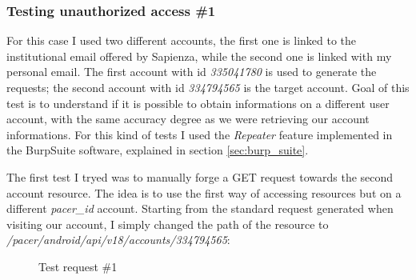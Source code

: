 		\subsubsection{Testing unauthorized access \#1}
			\par For this case I used two different accounts, the first one is linked to the institutional email offered by Sapienza, while the second one is linked with my personal email. The first account with id \textit{335041780} is used to generate the requests; the second account with id \textit{334794565} is the target account. Goal of this test is to understand if it is possible to obtain informations on a different user account, with the same accuracy degree as we were retrieving our account informations. For this kind of tests I used the \textit{Repeater} feature implemented in the BurpSuite software, explained in section \ref{sec:burp_suite}. \newline
			\par The first test I tryed was to manually forge a GET request towards the second account resource. The idea is to use the first way of accessing resources but on a different \textit{pacer\_id} account. Starting from the standard request generated when visiting our account, I simply changed the path of the resource to \textit{/pacer/android/api/v18/accounts/334794565}:
			\begin{figure}[ht]
				\centering
				\caption{Test request \#1}
			\end{figure}
